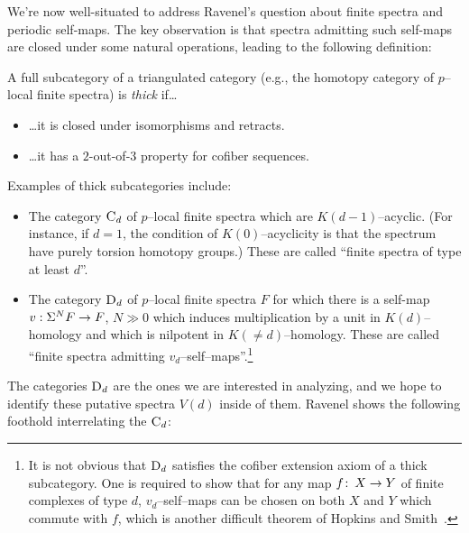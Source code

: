 We're now well-situated to address Ravenel's question about finite spectra and periodic self-maps.  The key observation is that spectra admitting such self-maps are closed under some natural operations, leading to the following definition:

\begin{definition}
A full subcategory of a triangulated category (e.g., the homotopy category of \(p\)--local finite spectra) is \textit{thick} if\ldots
\begin{itemize}
\item \ldots it is closed under isomorphisms and retracts.
\item \ldots it has a \(2\)-out-of-\(3\) property for cofiber sequences.
\end{itemize}
\end{definition}

\noindent Examples of thick subcategories include:
\begin{itemize}
\item The category \(\normalfont\textsc{C}_d\) of \(p\)--local finite spectra which are \(K(d-1)\)--acyclic.  (For instance, if \(d = 1\), the condition of \(K(0)\)--acyclicity is that the spectrum have purely torsion homotopy groups.)  These are called ``finite spectra of type at least \(d\)''.
\item The category \(\normalfont\textsc{D}_d\) of \(p\)--local finite spectra \(F\) for which there is a self-map \(v: \Sigma^N F \to F\), \(N \gg 0\) which induces multiplication by a unit in \(K(d)\)--homology and which is nilpotent in \(K(\ne d)\)--homology.  These are called ``finite spectra admitting \(v_d\)--self--maps''.\footnote{It is not obvious that \(\normalfont\textsc{D}_d\) satisfies the cofiber extension axiom of a thick subcategory.  One is required to show that for any map $f\colon\thinspace X \to Y$ of finite complexes of type \(d\), \(v_d\)--self--maps can be chosen on both $X$ and $Y$ which commute with $f$, which is another difficult theorem of Hopkins and Smith~\cite[Theorem 11]{HopkinsSmith}.}
\end{itemize}

\noindent The categories \(\normalfont\textsc{D}_d\) are the ones we are interested in analyzing, and we hope to identify these putative spectra \(V(d)\) inside of them.  Ravenel shows the following foothold interrelating the \(\normalfont\textsc{C}_d\):

